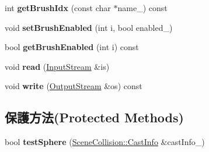 \begin{DoxyCompactItemize}
\item 
int {\bfseries get\+Brush\+Idx} (const char $\ast$name\+\_\+) const \hypertarget{class_i_dream_sky_1_1_scene_collision_1_1_brush_list_acec4b59d499b26aa8612c3711d58e2a2}{}\label{class_i_dream_sky_1_1_scene_collision_1_1_brush_list_acec4b59d499b26aa8612c3711d58e2a2}

\item 
void {\bfseries set\+Brush\+Enabled} (int i, bool enabled\+\_\+)\hypertarget{class_i_dream_sky_1_1_scene_collision_1_1_brush_list_ae022c51a53265850b1c43d619fde7845}{}\label{class_i_dream_sky_1_1_scene_collision_1_1_brush_list_ae022c51a53265850b1c43d619fde7845}

\item 
bool {\bfseries get\+Brush\+Enabled} (int i) const \hypertarget{class_i_dream_sky_1_1_scene_collision_1_1_brush_list_ad25b92d0151709d5ec2366d87a2637ff}{}\label{class_i_dream_sky_1_1_scene_collision_1_1_brush_list_ad25b92d0151709d5ec2366d87a2637ff}

\item 
void {\bfseries read} (\hyperlink{class_i_dream_sky_1_1_input_stream}{Input\+Stream} \&is)\hypertarget{class_i_dream_sky_1_1_scene_collision_1_1_brush_list_a98c5d45d02d58c324ceca802bcf75e88}{}\label{class_i_dream_sky_1_1_scene_collision_1_1_brush_list_a98c5d45d02d58c324ceca802bcf75e88}

\item 
void {\bfseries write} (\hyperlink{class_i_dream_sky_1_1_output_stream}{Output\+Stream} \&os) const \hypertarget{class_i_dream_sky_1_1_scene_collision_1_1_brush_list_a6ed464fc255352cd29aaf5ca8c72806f}{}\label{class_i_dream_sky_1_1_scene_collision_1_1_brush_list_a6ed464fc255352cd29aaf5ca8c72806f}

\end{DoxyCompactItemize}
\subsection*{保護方法(Protected Methods)}
\begin{DoxyCompactItemize}
\item 
bool {\bfseries test\+Sphere} (\hyperlink{class_i_dream_sky_1_1_scene_collision_1_1_cast_info}{Scene\+Collision\+::\+Cast\+Info} \&cast\+Info\+\_\+)\hypertarget{class_i_dream_sky_1_1_scene_collision_1_1_brush_list_a2dc6cdbed40f2e8916bcb2488d618907}{}\label{class_i_dream_sky_1_1_scene_collision_1_1_brush_list_a2dc6cdbed40f2e8916bcb2488d618907}

\end{DoxyCompactItemize}
